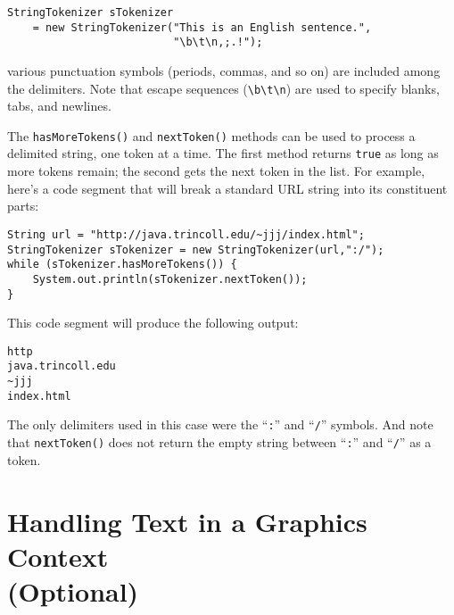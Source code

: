 \begin{jjjlisting}
\begin{lstlisting}
StringTokenizer sTokenizer
    = new StringTokenizer("This is an English sentence.",
                          "\b\t\n,;.!");
\end{lstlisting}
\end{jjjlisting}

\noindent various punctuation symbols (periods, commas, and so on)
are included among the delimiters. Note that escape sequences 
(\verb|\b\t\n|) are used to specify blanks, tabs, and newlines. 

The {\tt hasMoreTokens()} and {\tt nextToken()} methods can be used to
process a delimited string, one token at a time.   The first method
returns {\tt true} as long as more tokens remain; the second gets the
next token in the list.  For example, here's a code segment that will
break a standard URL string into its constituent parts:

\begin{jjjlisting}
\begin{lstlisting}
String url = "http://java.trincoll.edu/~jjj/index.html";
StringTokenizer sTokenizer = new StringTokenizer(url,":/");
while (sTokenizer.hasMoreTokens()) {
    System.out.println(sTokenizer.nextToken());
}
\end{lstlisting}
\end{jjjlisting}

\noindent This code segment will produce the following output:

\begin{jjjlisting}
\begin{lstlisting}
http
java.trincoll.edu
~jjj
index.html
\end{lstlisting}
\end{jjjlisting}

\noindent The only delimiters used in this case were the ``{\tt :}'' and ``{\tt /}''
symbols.  And note that {\tt nextToken()} does not return the empty string
between ``{\tt :}'' and ``{\tt /}'' as a token.


\section{Handling Text in a Graphics Context \\(Optional)}

